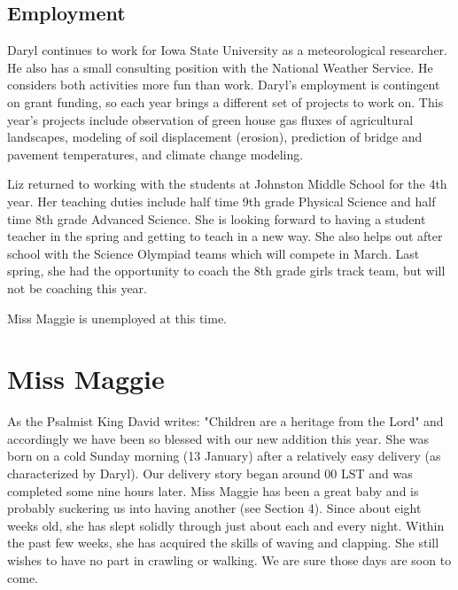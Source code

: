 \documentclass{article}
\begin{document}
\begin{multicols}{2}
\subsection{Employment}
Daryl continues to work for Iowa State University as a meteorological 
researcher.  He also has a small consulting position with the National
Weather Service.  He considers both activities more fun than work.  Daryl's
employment is contingent on grant funding, so each year brings a different
set of projects to work on.  This year's projects include observation of
green house gas fluxes of agricultural landscapes, modeling of soil
displacement (erosion), prediction of bridge and pavement temperatures, and
climate change modeling.

Liz returned to working with the students at Johnston Middle School for the
4th year.  Her teaching duties include half time 9th grade Physical Science
and half time 8th grade Advanced Science.  She is looking forward to having
a student teacher in the spring and getting to teach in a new way.  She
also helps out after school with the Science Olympiad teams which will
compete in March.  Last spring, she had the opportunity to coach the 8th
grade girls track team, but will not be coaching this year.

Miss Maggie is unemployed at this time. 

\section{Miss Maggie}

As the Psalmist King David writes: "Children are a heritage from the Lord"
and accordingly we have been so blessed with our new addition this year.  She was born on
a cold Sunday morning (13 January) after a relatively easy delivery (as 
characterized by Daryl).  Our delivery story began around 00 LST and was 
completed some nine hours later.  Miss Maggie has been a great baby and 
is probably suckering us into having another (see Section 4). Since about eight weeks old,
she has slept solidly through just about each and every night.  Within the
past few weeks, she has acquired the skills of waving and clapping.  She
still wishes to have no part in crawling or walking.  We are sure those days
are soon to come.


\end{multicols}
\end{document}
